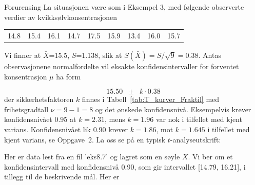 \begin{eksempel}{Forurensing}
La situasjonen være som i Eksempel 3, med følgende
observerte verdier av kvikksølvkonsentrasjonen
\begin{center}
\begin{tabular}{ccccccccc}
     14.8 & 15.4 & 16.1 & 14.7 & 17.5 & 15.9 & 13.4 & 16.0 & 15.7
\end{tabular}
\end{center}
Vi finner at $\bar{X}$=15.5, $S$=1.138, slik at $S(\bar{X})=S/\sqrt{9}=0.38$.
Antas observasjonene normalfordelte vil eksakte
konfidensintervaller for forventet konsentrasjon $\mu$ ha form

\[ 15.50\; \; \pm \; \; k\cdot 0.38\] 
der sikkerhetsfaktoren $k$ finnes i Tabell~\ref{tab:T_kurver_Fraktil} med frihetsgradtall
$\nu =9-1=8$ og det ønskede konfidensnivå. Eksempelvis
krever konfidensnivået 0.95 at $k=2.31$, mens $k=1.96$ var
nok i tilfellet med kjent varians. Konfidens\-nivået lik 0.90 krever
$k=1.86$, mot $k=1.645$ i tilfellet med kjent varians, se Oppgave~2.
La oss se på en typisk $t$-analyseutskrift:\\
\begin{center}  \end{center}
Her er data lest fra en fil 'eks8.7' og lagret som en søyle $X$.
Vi ber om et konfidensintervall med konfidens\-nivå  0.90, som gir
intervallet [14.79, 16.21], i tillegg til de beskrivende mål.
Her er\\[1mm]

\end{eksempel}
